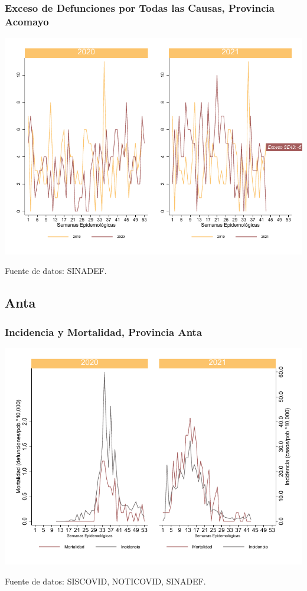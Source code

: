 \documentclass[xcolor=table]{beamer}
\begin{document}
\begin{frame}
	\frametitle{Exceso de Defunciones por Todas las Causas, Provincia Acomayo}
	\vspace{-.5cm}
	\begin{center}
		\includegraphics[width=0.8\linewidth, trim={0cm .5cm 0cm 0.2cm},clip]{../figuras/exceso_1.pdf}
	\end{center}
	{\tiny Fuente de datos: SINADEF.}
	
	\hyperlink{indicadores_provinciales}{}
\end{frame}

\subsection{Anta}

\begin{frame}[label=Anta]
	\frametitle{Incidencia y Mortalidad, Provincia Anta}
	\vspace{-.5cm}
	\begin{center}
		\includegraphics[width=0.8\linewidth, trim={0cm .5cm 0cm 0.2cm},clip]{../figuras/incidencia_mortalidad_20_21_2.pdf}
	\end{center}
	{\tiny Fuente de datos: SISCOVID, NOTICOVID, SINADEF.}
\end{frame}
\end{document}
